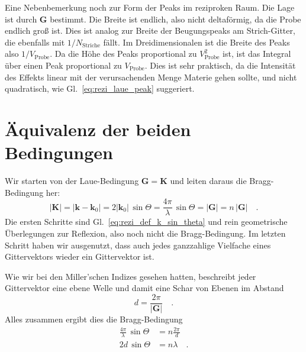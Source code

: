 Eine Nebenbemerkung noch zur Form der Peaks im reziproken Raum. Die Lage ist durch $\mathbf{G}$ bestimmt. Die Breite ist endlich, also nicht deltaförmig, da die Probe endlich groß ist. Dies ist analog zur Breite der Beugungspeaks am Strich-Gitter, die ebenfalls mit $1/N_\text{Striche}$ fällt. Im Dreidimensionalen ist die Breite des Peaks also $1/V_\text{Probe}$. Da die Höhe des Peaks proportional zu $ V_\text{Probe}^2$ ist, ist das Integral über einen Peak proportional zu $ V_\text{Probe}$. Dies ist sehr praktisch, da die Intensität des Effekts linear mit der verursachenden Menge Materie gehen sollte, und nicht quadratisch, wie Gl.~\ref{eq:rezi_laue_peak} suggeriert.


\section{Äquivalenz der beiden Bedingungen}

Wir starten von der Laue-Bedingung $\mathbf{G} =  \mathbf{K}$ und leiten daraus die Bragg-Bedingung her:
\begin{equation}
 | \mathbf{K} | =  |\mathbf{k} - \mathbf{k}_0| = 2 | \mathbf{k}_0| \, \sin \Theta = \frac{4 \pi}{ \lambda} \, \sin \Theta = | \mathbf{G} | = n \, | \mathbf{G} |  \quad .
\end{equation}
Die ersten Schritte sind Gl.~\ref{eq:rezi_def_k_sin_theta} und rein geometrische Überlegungen zur Reflexion, also noch nicht die Bragg-Bedingung. Im letzten Schritt haben wir ausgenutzt, dass auch jedes ganzzahlige Vielfache eines Gittervektors wieder ein Gittervektor ist.

Wie wir bei den Miller'schen Indizes gesehen hatten, beschreibt jeder Gittervektor eine ebene Welle und damit eine Schar von Ebenen im Abstand 
\begin{equation}
 d = \frac{2 \pi}{|\mathbf{G} | }  \quad .
\end{equation}
 Alles zusammen ergibt dies die Bragg-Bedingung
 \begin{align}
   \frac{4 \pi}{ \lambda} \, \sin \Theta  & = n \frac{2 \pi}{d } \\
   2 d  \, \sin \Theta  & = n \lambda   \quad .
 \end{align}
 

